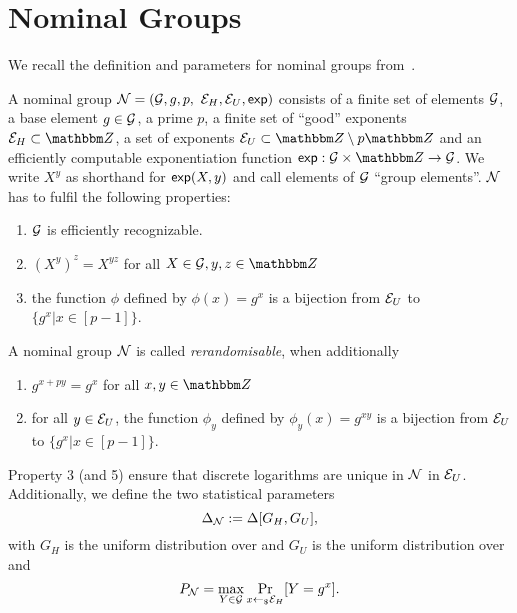\section{Nominal Groups}\label{app:nominal_groups}
We recall the definition and parameters for nominal groups from~\cite{EC:ABHKLR21_2}.

\begin{definition}
  A nominal group $\mathcal{N} = (\mathcal{G}, g, p, $ $\mathcal{E}_H, \mathcal{E}_U, \textnormal{\sf exp})$ consists of a finite set of elements $\mathcal{G}$, a base element $g
  \in \mathcal{G}$, a prime $p$, a finite set of ``good'' exponents $\nGE \subset \Z$, a set of exponents $\nGU\subset
  \Z\setminus p\Z$ and an efficiently computable exponentiation function $\nGexp: \nG \times \Z \rightarrow \nG$. We
  write $X^y$ as shorthand for $\textnormal{\sf exp}(X,y)$ and call elements of $\mathcal{G}$ ``group elements''.
  $\mathcal{N}$ has to fulfil the following properties:
  \begin{enumerate}
  \item $\mathcal{G}$ is efficiently recognizable.
  \item $\left(X^y\right)^z = X^{yz}$ for all $X \in \nG, y,z\in\Z$
  \item the function $\phi$ defined by $\phi(x) = g^x$ is a bijection from $\mathcal{E}_U$ to $\{g^x | x\in[p-1]\}$.
  \end{enumerate}
  A nominal group $\mathcal{N}$ is called \emph{rerandomisable}, when additionally
  \begin{enumerate}[resume]
  \item $g^{x+py} = g^x$ for all $x,y\in\Z$
  \item for all $y\in\mathcal{E}_U$, the function $\phi_y$ defined by $\phi_y(x) = g^{xy}$ is a bijection from $\mathcal{E}_U$ to $\{g^x |
    x \in [p-1]\}$.
  \end{enumerate}

  Property 3 (and 5) ensure that discrete logarithms are unique in $\mathcal{N}$ in $\mathcal{E}_U$. 
  Additionally, we define the two statistical parameters
  \[
    \Delta_{\mathcal{N}} := \Delta[G_H, G_U],
  \]
  with $G_H$ is the uniform distribution over \nGE and $G_U$ is the uniform distribution over \nGU and
  \[
    P_\mathcal{N} = \max_{Y \in \mathcal{G}} \underset{x\gets_{\scriptscriptstyle\$} \mathcal{E}_H}{\text{Pr}}[Y = g^x].
  \]
\end{definition}

